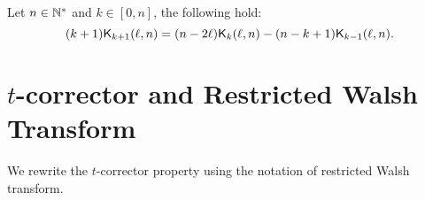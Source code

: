 \documentclass[11pt]{llncs}
\begin{document}
\begin{Prop}\label{prop:KrDMS}
Let $n\in \mathbb{N}^*$ and $k\in [0,n]$, the following hold:
\[(k+1)\mathsf{K}_{k+1}(\ell,n)=(n-2\ell)\mathsf{K}_{k}(\ell,n)-(n-k+1)\mathsf{K}_{k-1}(\ell,n).\]
\end{Prop}




\section{$t$-corrector and Restricted Walsh Transform}\label{sec:corr}



We rewrite the $t$-corrector property using the notation of restricted Walsh transform.
\end{document}
